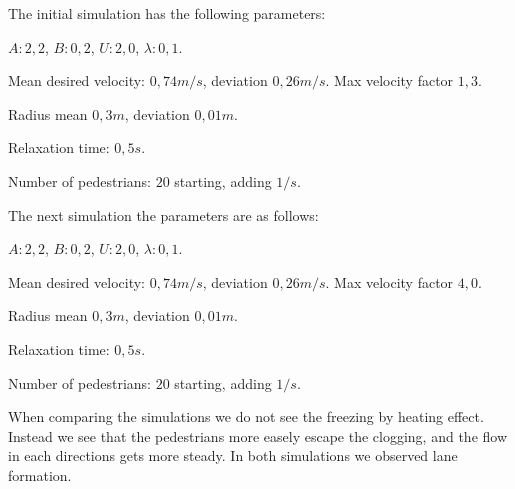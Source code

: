 The initial simulation has the following parameters:

\begin{itemize*}
    \item $A: 2,2$, $B: 0,2$, $U: 2,0$, $\lambda: 0,1$.
    \item Mean desired velocity: $0,74 m/s$, deviation $0,26 m/s$. Max 
        velocity factor $1,3$.
    \item Radius mean $0,3 m$, deviation $0,01 m$.
    \item Relaxation time: $0,5 s$.
    \item Number of pedestrians: $20$ starting, adding $1/s$.
\end{itemize*}

The next simulation the parameters are as follows:

\begin{itemize*}
    \item $A: 2,2$, $B: 0,2$, $U: 2,0$, $\lambda: 0,1$.
    \item Mean desired velocity: $0,74 m/s$, deviation $0,26 m/s$. Max 
        velocity factor $4,0$.
    \item Radius mean $0,3 m$, deviation $0,01 m$.
    \item Relaxation time: $0,5 s$.
    \item Number of pedestrians: $20$ starting, adding $1/s$.
\end{itemize*}

When comparing the simulations we do not see the freezing by heating effect.
Instead we see that the pedestrians more easely escape the clogging, and the flow in each directions
gets more steady. In both simulations we observed lane formation.


